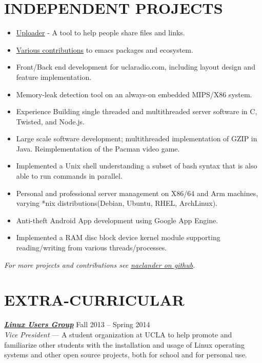 \documentclass[line,letterpaper]{resume}
\begin{document}
\begin{resume}
    \section{\uppercase{Independent Projects}}
	\begin{itemize}
	\item \underline{\href{https://github.com/naclander/uploader}{Uploader}} -
	A tool to help people share files and links.
        \item
        \underline{\href{https://tinyurl.com/la495b3}{Various contributions}}
        to emacs packages and ecosystem.
	\item Front/Back end development for uclaradio.com, including layout design
	      and feature implementation.
	\item Memory-leak detection tool on an always-on embedded MIPS/X86 system.
	\item Experience Building single threaded and multithreaded server software
	      in C, Twisted, and Node.js.
	\item Large scale software development; multithreaded implementation of GZIP
	      in Java. Reimplementation of the Pacman video game.
	\item Implemented a Unix shell understanding a subset of bash syntax
	that is also able to run commands in parallel.
	\item Personal and professional server management on X86/64 and Arm machines,
	varying *nix distributions(Debian, Ubuntu, RHEL, ArchLinux).
	\item Anti-theft Android App development using Google App Engine.
	\item Implemented a RAM disc block device kernel module supporting
	reading/writing from various threads/processes.
	\end{itemize}
    \vspace{-6pt}

    \hfill \emph{For more projects and contributions see
    \underline{\href{https://github.com/naclander}{naclander on github}}}.

    \vspace{-15pt}

\section{\uppercase{Extra-Curricular}}
    {\sl\textbf{\href{http://linux.ucla.edu}{Linux Users Group}}} \hfill Fall 2013 -- Spring 2014\\
    \emph{Vice President} --- A student organization at UCLA to help promote
	and familiarize other students with the installation and usage of Linux
	operating systems and other open source projects, both for school and for personal use.


   \end{resume}
\end{document}
